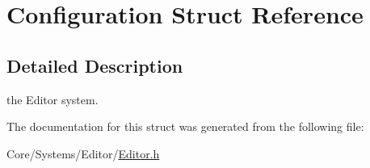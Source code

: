 \hypertarget{structConfiguration}{\section{Configuration Struct Reference}
\label{structConfiguration}
}


\subsection{Detailed Description}
the Editor system. 

The documentation for this struct was generated from the following file\-:\begin{DoxyCompactItemize}
\item 
Core/\-Systems/\-Editor/\hyperlink{Editor_8h}{Editor.\-h}\end{DoxyCompactItemize}
